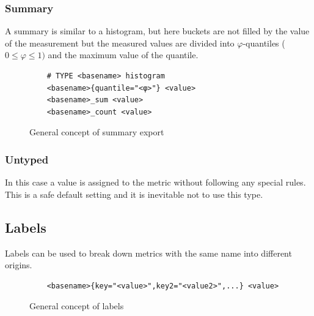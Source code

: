 \subsubsection{Summary}
A summary is similar to a histogram, but here buckets are not filled by the value of the measurement but the measured values are divided into $\varphi$-quantiles ($0 \le \varphi \le 1)$ and the maximum value of the quantile.
\begin{figure}[hbt!]
	\begin{verbatim}
	# TYPE <basename> histogram
	<basename>{quantile="<φ>"} <value>
	<basename>_sum <value>
	<basename>_count <value>
	\end{verbatim}
	\caption{General concept of summary export}
\end{figure}
\subsubsection{Untyped}
In this case a value is assigned to the metric without following any special rules. This is a safe default setting and it is inevitable not to use this type.
\subsection{Labels}
Labels can be used to break down metrics with the same name into different origins. 
\begin{figure}[!ht]
	\begin{verbatim}
	<basename>{key="<value>",key2="<value2>",...} <value>
	\end{verbatim}
	\caption{General concept of labels}
\end{figure}

